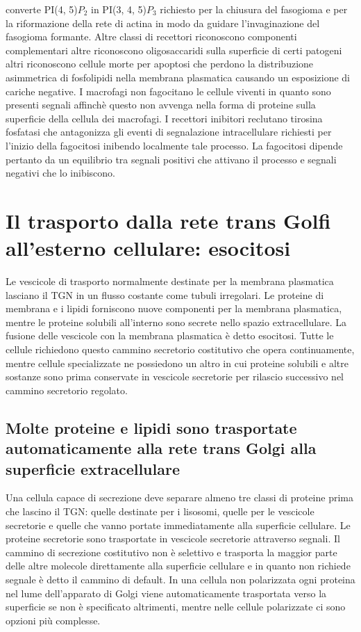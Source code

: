converte PI(4, 5)$P_2$ in PI(3, 4, 5)$P_3$ richiesto per la chiusura del fasogioma e per la riformazione della rete di actina in modo da guidare l'invaginazione del fasogioma formante. 
Altre classi di recettori riconoscono componenti complementari altre riconoscono oligosaccaridi sulla superficie di certi patogeni altri riconoscono cellule morte per apoptosi che 
perdono la distribuzione asimmetrica di fosfolipidi nella membrana plasmatica causando un esposizione di cariche negative. I macrofagi non fagocitano le cellule viventi in quanto 
sono presenti segnali affinch\`e questo non avvenga nella forma di proteine sulla superficie della cellula dei macrofagi. I recettori inibitori reclutano tirosina fosfatasi che 
antagonizza gli eventi di segnalazione intracellulare richiesti per l'inizio della fagocitosi inibendo localmente tale processo. La fagocitosi dipende pertanto da un equilibrio tra
segnali positivi che attivano il processo e segnali negativi che lo inibiscono.
\section{Il trasporto dalla rete trans Golfi all'esterno cellulare: esocitosi}
Le vescicole di trasporto normalmente destinate per la membrana plasmatica lasciano il TGN in un flusso costante come tubuli irregolari. Le proteine di membrana e i lipidi forniscono
nuove componenti per la membrana plasmatica, mentre le proteine solubili all'interno sono secrete nello spazio extracellulare. La fusione delle vescicole con la membrana plasmatica
\`e detto esocitosi. Tutte le cellule richiedono questo cammino secretorio costitutivo che opera continuamente, mentre cellule specializzate ne possiedono un altro in cui
proteine solubili e altre sostanze sono prima conservate in vescicole secretorie per rilascio successivo nel cammino secretorio regolato. 
\subsection{Molte proteine e lipidi sono trasportate automaticamente alla rete trans Golgi alla superficie extracellulare}
Una cellula capace di secrezione deve separare almeno tre classi di proteine prima che lascino il TGN: quelle destinate per i lisosomi, quelle per le vescicole secretorie e quelle che
vanno portate immediatamente alla superficie cellulare. Le proteine secretorie sono trasportate in vescicole secretorie attraverso segnali. Il cammino di secrezione costitutivo non \`e
selettivo e trasporta la maggior parte delle altre molecole direttamente alla superficie cellulare e in quanto non richiede segnale \`e detto il cammino di default. In una cellula non
polarizzata ogni proteina nel lume dell'apparato di Golgi viene automaticamente trasportata verso la superficie se non \`e specificato altrimenti, mentre nelle cellule polarizzate ci
sono opzioni pi\`u complesse.
